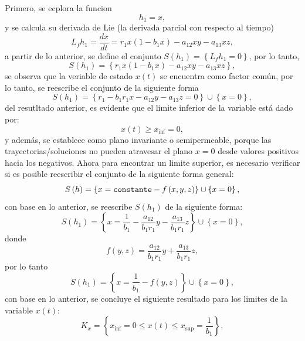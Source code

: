 \documentclass[letterpaper,11pt]{article}
\begin{document}
Primero, se ecplora la funcion%
\begin{equation*}
h_{1}=x,
\end{equation*}%
y se calcula su derivada de Lie (la derivada parcial con respecto al tiempo)%
\begin{equation*}
L_{f}h_{1}=\frac{dx}{dt}=r_{1}x\left( 1-b_{1}x\right) -a_{12}xy-a_{13}xz,
\end{equation*}%
a partir de lo anterior, se define el conjunto $S\left( h_{1}\right)
=\left\{ L_{f}h_{1}=0\right\} $, por lo tanto,%
\begin{equation*}
S\left( h_{1}\right) =\left\{ r_{1}x\left( 1-b_{1}x\right)
-a_{12}xy-a_{13}xz\right\} ,
\end{equation*}%
se observa que la veriable de estado $x\left( t\right) $ se encuentra como
factor com\'{u}n, por lo tanto, se reescribe el conjunto de la siguiente
forma%
\begin{equation*}
S\left( h_{1}\right) =\left\{ r_{1}-b_{1}r_{1}x-a_{12}y-a_{13}z=0\right\}
\cup \left\{ x=0\right\} ,
\end{equation*}%
del resutltado anterior, es evidente que el limite inferior de la variable
est\'{a} dado por:%
\begin{equation*}
x\left( t\right) \geq x_{\inf }=0,
\end{equation*}%
y adem\'{a}s, se establece como plano invariante o semipermeable, porque las
trayectorias/soluciones no pueden atravesar el plano $x=0$ desde valores
positivos hacia los negativos. Ahora para encontrar un limite superior, es
necesario verificar si es posible reescribir el conjunto de la siguiente
forma general:%
\begin{equation*}
S\left( h\right) =\left\{ x=\text{\texttt{constante}}-{\scriptsize f}\left(
x,y,z\right) \right\} \cup \left\{ x=0\right\} ,
\end{equation*}%
con base en lo anterior, se reescribe $S\left( h_{1}\right) $ de la
siguiente forma:%
\begin{equation*}
S\left( h_{1}\right) =\left\{ x=\frac{1}{b_{1}}-\frac{a_{12}}{b_{1}r_{1}}y-%
\frac{a_{13}}{b_{1}r_{1}}z\right\} \cup \left\{ x=0\right\} ,
\end{equation*}%
donde%
\begin{equation*}
f\left( y,z\right) =\frac{a_{12}}{b_{1}r_{1}}y+\frac{a_{13}}{b_{1}r_{1}}z,
\end{equation*}%
por lo tanto%
\begin{equation*}
S\left( h_{1}\right) =\left\{ x=\frac{1}{b_{1}}-f\left( y,z\right) \right\}
\cup \left\{ x=0\right\} ,
\end{equation*}%
con base en lo anterior, se concluye el siguiente resultado para los limites
de la variable $x\left( t\right) $:%
\begin{equation*}
K_{x}=\left\{ x_{\inf }=0\leq x\left( t\right) \leq x_{\sup }=\frac{1}{b_{1}}%
\right\} ,
\end{equation*}
\end{document}
